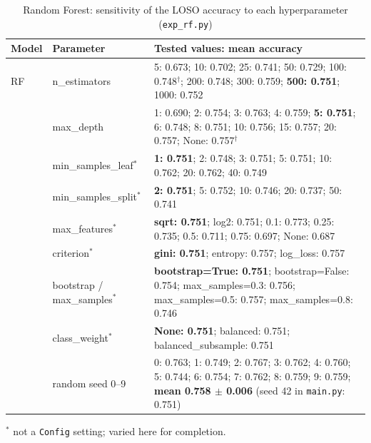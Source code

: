 \begin{table}[!htb]
    \centering
    \caption{Random Forest: sensitivity of the LOSO accuracy to each hyperparameter (\texttt{exp\_rf.py})}
    \label{tab:sens_rf}
    \small
    \begin{tabularx}{\textwidth}{@{} l l X @{}}
        \toprule
        \textbf{Model} & \textbf{Parameter} & \textbf{Tested values: mean accuracy} \\
        \midrule
        RF & n\_estimators & 5: 0.673; 10: 0.702; 25: 0.741; 50: 0.729; 100: 0.748$^{\dagger}$; 200: 0.748; 300: 0.759; \textbf{500: 0.751}; 1000: 0.752 \\
         & max\_depth & 1: 0.690; 2: 0.754; 3: 0.763; 4: 0.759; \textbf{5: 0.751}; 6: 0.748; 8: 0.751; 10: 0.756; 15: 0.757; 20: 0.757; None: 0.757$^{\dagger}$ \\
        \midrule
         & min\_samples\_leaf$^{*}$ & \textbf{1: 0.751}; 2: 0.748; 3: 0.751; 5: 0.751; 10: 0.762; 20: 0.762; 40: 0.749 \\
         & min\_samples\_split$^{*}$ & \textbf{2: 0.751}; 5: 0.752; 10: 0.746; 20: 0.737; 50: 0.741 \\
         & max\_features$^{*}$ & \textbf{sqrt: 0.751}; log2: 0.751; 0.1: 0.773; 0.25: 0.735; 0.5: 0.711; 0.75: 0.697; None: 0.687 \\
         & criterion$^{*}$ & \textbf{gini: 0.751}; entropy: 0.757; log\_loss: 0.757 \\
         & bootstrap / max\_samples$^{*}$ & \textbf{bootstrap=True: 0.751}; bootstrap=False: 0.754; max\_samples=0.3: 0.756; max\_samples=0.5: 0.757; max\_samples=0.8: 0.746 \\
         & class\_weight$^{*}$ & \textbf{None: 0.751}; balanced: 0.751; balanced\_subsample: 0.751 \\
        \midrule
        & random seed 0--9 & 0: 0.763; 1: 0.749; 2: 0.767; 3: 0.762; 4: 0.760; 5: 0.744; 6: 0.754; 7: 0.762; 8: 0.759; 9: 0.759; \textbf{mean 0.758 $\pm$ 0.006} (seed 42 in \texttt{main.py}: 0.751) \\
        \bottomrule
    \end{tabularx}
    \par\smallskip\footnotesize $^{*}$ not a \texttt{Config} setting; varied here for completion.
\end{table}

